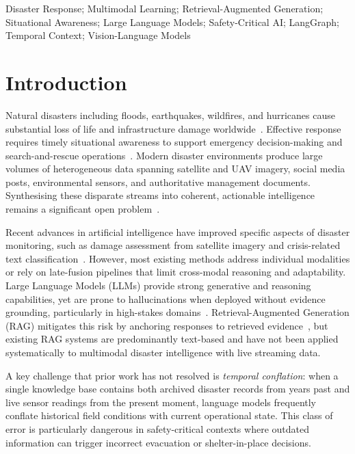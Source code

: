 \documentclass[conference]{IEEEtran}
\begin{document}
\begin{IEEEkeywords}
Disaster Response; Multimodal Learning; Retrieval-Augmented Generation;
Situational Awareness; Large Language Models; Safety-Critical AI; LangGraph;
Temporal Context; Vision-Language Models
\end{IEEEkeywords}

\section{Introduction}

Natural disasters including floods, earthquakes, wildfires, and hurricanes
cause substantial loss of life and infrastructure damage worldwide~\cite{b1}.
Effective response requires timely situational awareness to support emergency
decision-making and search-and-rescue operations~\cite{b2}. Modern disaster
environments produce large volumes of heterogeneous data spanning satellite and
UAV imagery, social media posts, environmental sensors, and authoritative
management documents. Synthesising these disparate streams into coherent,
actionable intelligence remains a significant open problem~\cite{b3}.

Recent advances in artificial intelligence have improved specific aspects of
disaster monitoring, such as damage assessment from satellite imagery and
crisis-related text classification~\cite{b4}. However, most existing methods
address individual modalities or rely on late-fusion pipelines that limit
cross-modal reasoning and adaptability. Large Language Models (LLMs) provide
strong generative and reasoning capabilities, yet are prone to hallucinations
when deployed without evidence grounding, particularly in high-stakes
domains~\cite{b5}. Retrieval-Augmented Generation (RAG) mitigates this risk by
anchoring responses to retrieved evidence~\cite{b6}, but existing RAG systems
are predominantly text-based and have not been applied systematically to
multimodal disaster intelligence with live streaming data.

A key challenge that prior work has not resolved is \emph{temporal conflation}:
when a single knowledge base contains both archived disaster records from years
past and live sensor readings from the present moment, language models
frequently conflate historical field conditions with current operational state.
This class of error is particularly dangerous in safety-critical contexts
where outdated information can trigger incorrect evacuation or shelter-in-place
decisions.
\end{document}
